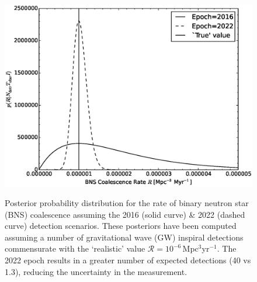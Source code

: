 \documentclass[twocolumn,nofootinbib]{revtex4-1}
\newcommand{\cbcrate}{{{\mathcal R}}}
\def\bns#1{binary neutron star#1 (BNS#1)\gdef\bns{BNS}}
\def\gw#1{gravitational wave#1 (GW#1)\gdef\gw{GW}}
\begin{document}
\begin{figure}%
\centering
{\includegraphics[width=\linewidth]{aligo_rate_re.eps}}
\caption{Posterior probability distribution for the rate of \bns{} coalescence
    assuming the 2016 (solid curve) \& 2022 (dashed curve) detection scenarios.
    These posteriors have been computed assuming a number of \gw{} inspiral
    detections commensurate with the `realistic' value
$\cbcrate=10^{-6}$\,Mpc$^{3}$yr$^{-1}$.  The 2022 epoch results in a greater
number of expected detections (40 vs 1.3), reducing the uncertainty in the
measurement.\label{fig:aligorate}}
\end{figure}
\end{document}
